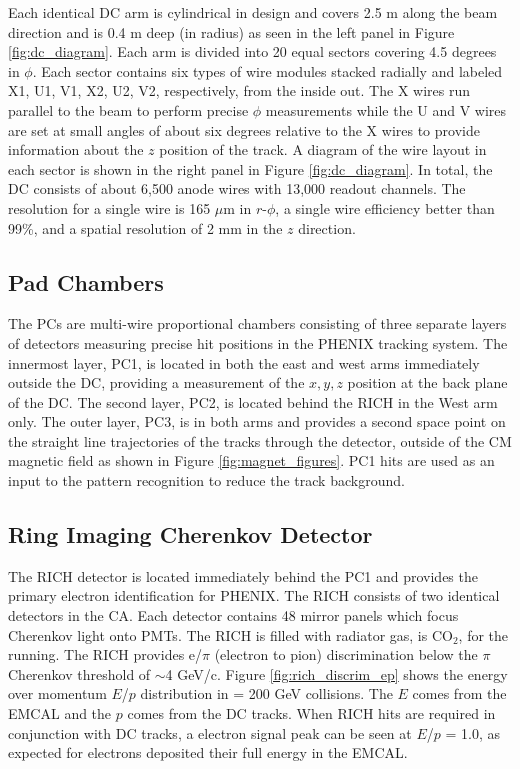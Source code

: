Each identical DC arm is cylindrical in design and covers 2.5 m along the beam direction and is 0.4 m deep (in radius) as seen in the left panel in Figure \ref{fig:dc_diagram}. Each arm is divided into 20 equal sectors covering 4.5 degrees in $\phi$. Each sector contains six types of wire modules stacked radially and labeled X1, U1, V1, X2, U2, V2, respectively, from the inside out. The X wires run parallel to the beam to perform precise $\phi$ measurements while the U and V wires are set at small angles of about six degrees relative to the X wires to provide information about the $z$ position of the track. A diagram of the wire layout in each sector is shown in the right panel in Figure \ref{fig:dc_diagram}. In total, the DC consists of about 6,500 anode wires with 13,000 readout channels. The  resolution for a single wire is 165 $\mu$m in $r$-$\phi$, a single wire efficiency better than 99\%, and a spatial resolution of  2 mm in the $z$ direction.

\subsection{Pad Chambers}
The PCs are multi-wire proportional chambers consisting of three separate layers of detectors measuring precise hit positions in the PHENIX tracking system. The innermost layer, PC1, is located in both the east and west arms immediately outside the DC, providing a measurement of the $x, y, z$ position at the back plane of the DC. The second layer, PC2, is located behind the RICH in the West arm only. The outer layer, PC3, is in both arms and provides a second space point on the straight line trajectories of the tracks through the detector, outside of the CM magnetic field as shown in Figure \ref{fig:magnet_figures}. PC1 hits are used as an input to the pattern recognition to reduce the track background.

\subsection{Ring Imaging Cherenkov Detector}
The RICH detector is located immediately behind the PC1 and provides the primary electron identification for PHENIX. The RICH consists of two identical detectors in the CA. Each detector contains 48 mirror panels which focus Cherenkov light onto PMTs. The RICH is filled with radiator gas, is CO$_2$, for the \pau running. The RICH provides e/$\pi$ (electron to pion) discrimination below the $\pi$ Cherenkov threshold of $\sim$4 GeV/c. Figure \ref{fig:rich_discrim_ep} shows the energy over momentum $E$/$p$ distribution in \auau \sqsn = 200 GeV collisions. The $E$ comes from the EMCAL and the $p$ comes from the DC tracks. When RICH hits are required in conjunction with DC tracks, a electron signal peak can be seen at $E$/$p$ = 1.0, as expected for electrons deposited their full energy in the EMCAL.

